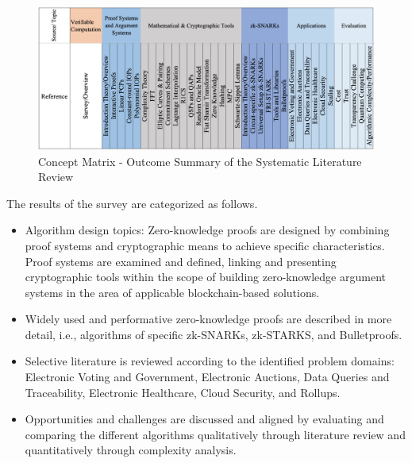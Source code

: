 \begin{figure}[hbt]
	\centering
		\includegraphics[width=1.0\textwidth]{Pictures/concept_matrix_headers.png}
	\caption{Concept Matrix - Outcome Summary of the Systematic Literature Review}
	\label{fig:concept_matrix}
\end{figure}

The results of the survey are categorized as follows. 
\begin{itemize}
    \item Algorithm design topics: Zero-knowledge proofs are designed by combining proof systems and cryptographic means to achieve specific characteristics. Proof systems are examined and defined, linking and presenting cryptographic tools within the scope of building zero-knowledge argument systems in the area of applicable blockchain-based solutions.
    \item Widely used and performative zero-knowledge proofs are described in more detail, i.e., algorithms of specific zk-SNARKs, zk-STARKS, and Bulletproofs.
    \item Selective literature is reviewed according to the identified problem domains: Electronic Voting and Government, Electronic Auctions, Data Queries and Traceability, Electronic Healthcare, Cloud Security, and Rollups.
    \item Opportunities and challenges are discussed and aligned by evaluating and comparing the different algorithms qualitatively through literature review and quantitatively through complexity analysis.
\end{itemize}

